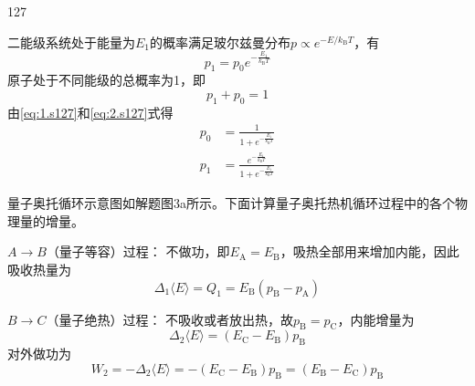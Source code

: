 \begin{solution}{127}
    \begin{subsolution}
        二能级系统处于能量为$E _ { 1 }$的概率满足玻尔兹曼分布$p \propto e ^ { - E / k _ { \mathrm { B } } T }$，有
        \begin{equation}
            p _ {1} = p _ {0} e ^ {- \frac {E _ {1}}{k _ {\mathrm{B}} T}}
            \label{eq:1.s127}
        \end{equation}
        原子处于不同能级的总概率为1，即
        \begin{equation}
            p _ {1} + p _ {0} = 1
            \label{eq:2.s127}
        \end{equation}
        由\eqref{eq:1.s127}和\eqref{eq:2.s127}式得
        \begin{align}
            p _ {0} &= \frac {1}{1 + e ^ {- \frac {E _ {1}}{k _ {\mathrm{B}} T}}} \label{eq:3.s127} \\
            p _ {1} &= \frac {e ^ {- \frac {E _ {1}}{k _ {\mathrm{B}} T}}}{1 + e ^ {- \frac {E _ {1}}{k _ {\mathrm{B}} T}}} \label{eq:4.s127}
        \end{align}
    \end{subsolution}
    \begin{subsolution}
        量子奥托循环示意图如解题图3a所示。下面计算量子奥托热机循环过程中的各个物理量的增量。

        $A \to B$（量子等容）过程：
        不做功，即$E _ { \mathrm { A } } = E _ { \mathrm { B } }$，吸热全部用来增加内能，因此吸收热量为
        \begin{equation}
            \Delta_ {1} \langle E \rangle = Q _ {1} = E _ {\mathrm{B}} \left(p _ {\mathrm{B}} - p _ {\mathrm{A}}\right)
            \label{eq:5.s127}
        \end{equation}

        $B \to C$（量子绝热）过程：
        不吸收或者放出热，故$p _ { \mathrm { B } } = p _ { \mathrm { C } }$，内能增量为
        \begin{equation}
            \Delta_ {2} \langle E \rangle = \left(E _ {\mathrm{C}} - E _ {\mathrm{B}}\right) p _ {\mathrm{B}}
            \label{eq:6.s127}
        \end{equation}
        对外做功为
        \begin{equation}
            W _ {2} = - \Delta_ {2} \langle E \rangle = - \left(E _ {\mathrm{C}} - E _ {\mathrm{B}}\right) p _ {\mathrm{B}} = \left(E _ {\mathrm{B}} - E _ {\mathrm{C}}\right) p _ {\mathrm{B}}
            \label{eq:7.s127}
        \end{equation}


\end{subsolution}
\end{solution}
